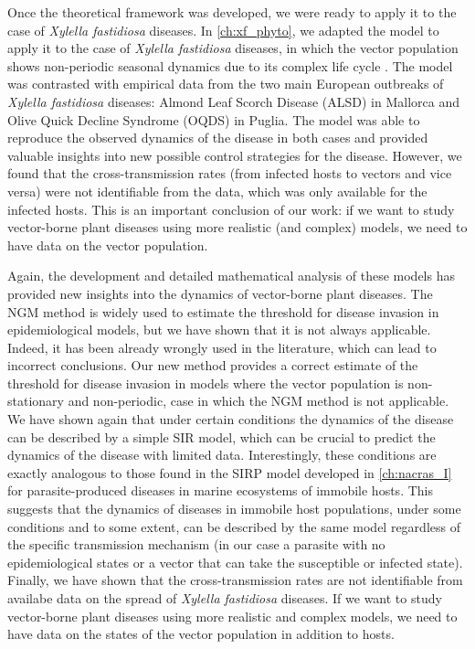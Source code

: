 Once the theoretical framework was developed, we were ready to apply it to the
case of \textit{Xylella fastidiosa} diseases. In \cref{ch:xf_phyto}, we adapted
the model to apply it to the case of \textit{Xylella fastidiosa} diseases, in
which the vector population shows non-periodic seasonal dynamics due to its
complex life cycle \cite{GimenezRomero2023}. The model was contrasted with
empirical data from the two main European outbreaks of \textit{Xylella
    fastidiosa} diseases: Almond Leaf Scorch Disease (ALSD) in Mallorca and
Olive Quick Decline Syndrome (OQDS) in Puglia. The model was able to reproduce
the observed dynamics of the disease in both cases and provided valuable
insights into new possible control strategies for the disease. However, we
found that the cross-transmission rates (from infected hosts to vectors and
vice versa) were not identifiable from the data, which was only available for
the infected hosts. This is an important conclusion of our work: if we want to
study vector-borne plant diseases using more realistic (and complex) models, we
need to have data on the vector population.

Again, the development and detailed mathematical analysis of these models has
provided new insights into the dynamics of vector-borne plant diseases. The NGM
method is widely used to estimate the threshold for disease invasion in
epidemiological models, but we have shown that it is not always applicable.
Indeed, it has been already wrongly used in the literature, which can lead to
incorrect conclusions. Our new method provides a correct estimate of the
threshold for disease invasion in models where the vector population is
non-stationary and non-periodic, case in which the NGM method is not
applicable. We have shown again that under certain conditions the dynamics of
the disease can be described by a simple SIR model, which can be crucial to
predict the dynamics of the disease with limited data. Interestingly, these
conditions are exactly analogous to those found in the SIRP model developed in
\cref{ch:nacras_I} for parasite-produced diseases in marine ecosystems of
immobile hosts. This suggests that the dynamics of diseases in immobile host
populations, under some conditions and to some extent, can be described by the
same model regardless of the specific transmission mechanism (in our case a
parasite with no epidemiological states or a vector that can take the
susceptible or infected state). Finally, we have shown that the
cross-transmission rates are not identifiable from availabe data on the spread
of \textit{Xylella fastidiosa} diseases. If we want to study vector-borne
plant diseases using more realistic and complex models, we need to have data
on the states of the vector population in addition to hosts.

